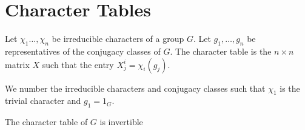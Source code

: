 \documentclass[../Project.tex]{subfiles}
\begin{document}
\newpage
\section{Character Tables}
\begin{defi}
	Let $\chi_1\dots,\chi_n$ be irreducible characters of a group $G$. Let $g_1,\dots,g_n$ be representatives of the conjugacy classes of $G$. The character table is the $n \times n$ matrix $X$ such that the entry $X^i_j = \chi_i(g_j)$.\\
\end{defi}

We number the irreducible characters and conjugacy classes such that $\chi_1$ is the trivial character and $g_1 = 1_G$.

\begin{prop}[\cite{2}]
	The character table of $G$ is invertible
\end{prop}
\end{document}
